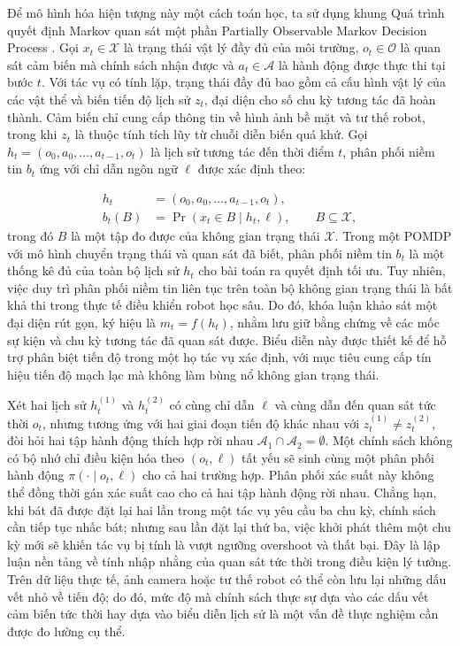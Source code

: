 Để mô hình hóa hiện tượng này một cách toán học, ta sử dụng khung Quá trình quyết định Markov quan sát một phần Partially Observable Markov Decision Process \cite{pomdp1998}. Gọi $x_t \in \mathcal X$ là trạng thái vật lý đầy đủ của môi trường, $o_t \in \mathcal O$ là quan sát cảm biến mà chính sách nhận được và $a_t \in \mathcal A$ là hành động được thực thi tại bước $t$. Với tác vụ có tính lặp, trạng thái đầy đủ bao gồm cả cấu hình vật lý của các vật thể và biến tiến độ lịch sử $z_t$, đại diện cho số chu kỳ tương tác đã hoàn thành. Cảm biến chỉ cung cấp thông tin về hình ảnh bề mặt và tư thế robot, trong khi $z_t$ là thuộc tính tích lũy từ chuỗi diễn biến quá khứ. Gọi $h_t = (o_0, a_0, \ldots, a_{t-1}, o_t)$ là lịch sử tương tác đến thời điểm $t$, phân phối niềm tin $b_t$ ứng với chỉ dẫn ngôn ngữ $\ell$ được xác định theo:

\begin{equation}
\begin{aligned}
h_t &= (o_0,a_0,\ldots,a_{t-1},o_t),\\
b_t(B) &= \Pr(x_t\in B\mid h_t,\ell),\qquad B\subseteq\mathcal X,
\end{aligned}
\end{equation}
trong đó $B$ là một tập đo được của không gian trạng thái $\mathcal X$. Trong một POMDP với mô hình chuyển trạng thái và quan sát đã biết, phân phối niềm tin $b_t$ là một thống kê đủ của toàn bộ lịch sử $h_t$ cho bài toán ra quyết định tối ưu. Tuy nhiên, việc duy trì phân phối niềm tin liên tục trên toàn bộ không gian trạng thái là bất khả thi trong thực tế điều khiển robot học sâu. Do đó, khóa luận khảo sát một đại diện rút gọn, ký hiệu là $m_t = f(h_t)$, nhằm lưu giữ bằng chứng về các mốc sự kiện và chu kỳ tương tác đã quan sát được. Biểu diễn này được thiết kế để hỗ trợ phân biệt tiến độ trong một họ tác vụ xác định, với mục tiêu cung cấp tín hiệu tiến độ mạch lạc mà không làm bùng nổ không gian trạng thái.

Xét hai lịch sử $h_t^{(1)}$ và $h_t^{(2)}$ có cùng chỉ dẫn $\ell$ và cùng dẫn đến quan sát tức thời $o_t$, nhưng tương ứng với hai giai đoạn tiến độ khác nhau với $z_t^{(1)} \neq z_t^{(2)}$, đòi hỏi hai tập hành động thích hợp rời nhau $\mathcal A_1 \cap \mathcal A_2 = \emptyset$. Một chính sách không có bộ nhớ chỉ điều kiện hóa theo $(o_t, \ell)$ tất yếu sẽ sinh cùng một phân phối hành động $\pi(\cdot \mid o_t, \ell)$ cho cả hai trường hợp. Phân phối xác suất này không thể đồng thời gán xác suất cao cho cả hai tập hành động rời nhau. Chẳng hạn, khi bát đã được đặt lại hai lần trong một tác vụ yêu cầu ba chu kỳ, chính sách cần tiếp tục nhấc bát; nhưng sau lần đặt lại thứ ba, việc khởi phát thêm một chu kỳ mới sẽ khiến tác vụ bị tính là vượt ngưỡng overshoot và thất bại. Đây là lập luận nền tảng về tính nhập nhằng của quan sát tức thời trong điều kiện lý tưởng. Trên dữ liệu thực tế, ảnh camera hoặc tư thế robot có thể còn lưu lại những dấu vết nhỏ về tiến độ; do đó, mức độ mà chính sách thực sự dựa vào các dấu vết cảm biến tức thời hay dựa vào biểu diễn lịch sử là một vấn đề thực nghiệm cần được đo lường cụ thể.

